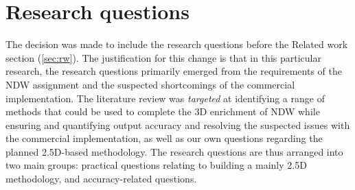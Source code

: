 
\section{Research questions}
\label{sec:rq}

The decision was made to include the research questions before the Related work section (\ref{sec:rw}). The justification for this change is that in this particular research, the research questions primarily emerged from the requirements of the NDW assignment and the suspected shortcomings of the commercial implementation. The literature review was \textit{targeted} at identifying a range of methods that could be used to complete the 3D enrichment of NDW while ensuring and quantifying output accuracy and resolving the suspected issues with the commercial implementation, as well as our own questions regarding the planned 2.5D-based methodology. The research questions are thus arranged into two main groups: practical questions relating to building a mainly 2.5D methodology, and accuracy-related questions.

